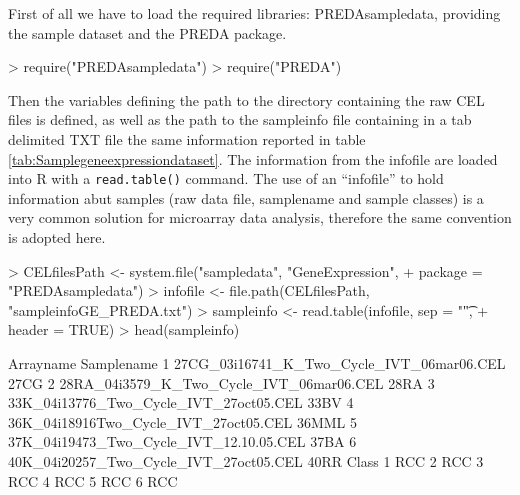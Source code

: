 \documentclass[a4paper,10pt]{article}
\begin{document}
First of all we have to load the required libraries: PREDAsampledata, providing the sample dataset and the PREDA package.


\begin{Schunk}
\begin{Sinput}
> require("PREDAsampledata")
> require("PREDA")
\end{Sinput}
\end{Schunk}

Then the variables defining the path to the directory containing the raw CEL files is defined, as well as the path to the sampleinfo file containing in a tab delimited TXT file the same information reported in table \ref{tab:Samplegeneexpressiondataset}. The information from the infofile are loaded into R with a \texttt{read.table()} command. The use of an ``infofile'' to hold information abut samples (raw data file, samplename and sample classes) is a very common solution for microarray data analysis, therefore the same convention is adopted here.

\begin{Schunk}
\begin{Sinput}
> CELfilesPath <- system.file("sampledata", "GeneExpression", 
+     package = "PREDAsampledata")
> infofile <- file.path(CELfilesPath, "sampleinfoGE_PREDA.txt")
> sampleinfo <- read.table(infofile, sep = "\t", 
+     header = TRUE)
> head(sampleinfo)
\end{Sinput}
\begin{Soutput}
                                  Arrayname Samplename
1 27CG_03i16741_K_Two_Cycle_IVT_06mar06.CEL       27CG
2  28RA_04i3579_K_Two_Cycle_IVT_06mar06.CEL       28RA
3    33K_04i13776_Two_Cycle_IVT_27oct05.CEL       33BV
4     36K_04i18916Two_Cycle_IVT_27oct05.CEL      36MML
5   37K_04i19473_Two_Cycle_IVT_12.10.05.CEL       37BA
6    40K_04i20257_Two_Cycle_IVT_27oct05.CEL       40RR
  Class
1   RCC
2   RCC
3   RCC
4   RCC
5   RCC
6   RCC
\end{Soutput}
\end{Schunk}
\end{document}

